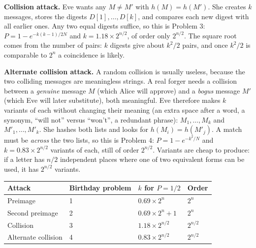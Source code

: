 \textbf{Collision attack.} Eve wants any $M \ne M'$ with $h(M) = h(M')$. She creates $k$ messages, stores the digests $D[1], \dots, D[k]$, and compares each new digest with all earlier ones. Any two equal digests suffice, so this is Problem 3: $P = 1 - e^{-k(k-1)/2N}$ and $k = 1.18 \times 2^{n/2}$, of order only $2^{n/2}$. The square root comes from the number of pairs: $k$ digests give about $k^2/2$ pairs, and once $k^2/2$ is comparable to $2^n$ a coincidence is likely.

\textbf{Alternate collision attack.} A random collision is usually useless, because the two colliding messages are meaningless strings. A real forger needs a collision between a \emph{genuine} message $M$ (which Alice will approve) and a \emph{bogus} message $M'$ (which Eve will later substitute), both meaningful. Eve therefore makes $k$ variants of each without changing their meaning (an extra space after a word, a synonym, ``will not'' versus ``won't'', a redundant phrase): $M_1, \dots, M_k$ and $M'_1, \dots, M'_k$. She hashes both lists and looks for $h(M_i) = h(M'_j)$. A match must be \emph{across} the two lists, so this is Problem 4: $P = 1 - e^{-k^2/N}$ and $k = 0.83 \times 2^{n/2}$ variants of each, still of order $2^{n/2}$. Variants are cheap to produce: if a letter has $n/2$ independent places where one of two equivalent forms can be used, it has $2^{n/2}$ variants.

\begin{center}\small
\begin{tabular}{@{}llll@{}}
\toprule
Attack & Birthday problem & $k$ for $P = 1/2$ & Order\\
\midrule
Preimage & 1 & $0.69 \times 2^n$ & $2^n$\\
Second preimage & 2 & $0.69 \times 2^n + 1$ & $2^n$\\
Collision & 3 & $1.18 \times 2^{n/2}$ & $2^{n/2}$\\
Alternate collision & 4 & $0.83 \times 2^{n/2}$ & $2^{n/2}$\\
\bottomrule
\end{tabular}
\end{center}

